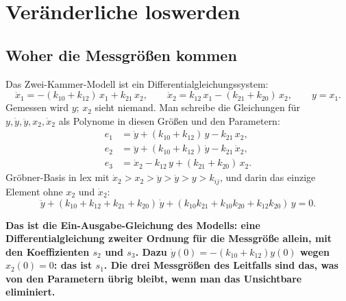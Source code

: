 \chapter{Veränderliche loswerden}

\section{Woher die Messgrößen kommen}

\begin{merksatz}
Das Zwei-Kammer-Modell ist ein Differentialgleichungssystem:
\[ \dot x_1 = -(k_{10} + k_{12})\,x_1 + k_{21}\,x_2, \qquad \dot x_2 = k_{12}\,x_1 - (k_{21} + k_{20})\,x_2, \qquad y = x_1 . \]
Gemessen wird $y$; $x_2$ sieht niemand. Man schreibe die Gleichungen für $y, \dot y, \ddot y, x_2, \dot x_2$ als Polynome in diesen Größen und den Parametern:
\begin{align*}
e_1 &= \dot y + (k_{10} + k_{12})\,y - k_{21}\,x_2, \\
e_2 &= \ddot y + (k_{10} + k_{12})\,\dot y - k_{21}\,\dot x_2, \\
e_3 &= \dot x_2 - k_{12}\,y + (k_{21} + k_{20})\,x_2 .
\end{align*}
Gröbner-Basis in lex mit $\dot x_2 > x_2 > \ddot y > \dot y > y > k_{ij}$, und darin das einzige Element ohne $x_2$ und $\dot x_2$:
\[ \ddot y + (k_{10} + k_{12} + k_{21} + k_{20})\,\dot y + (k_{10}k_{21} + k_{10}k_{20} + k_{12}k_{20})\,y = 0 . \]

\begin{center}
\begin{minipage}{0.9\textwidth}
\textbf{Das ist die Ein-Ausgabe-Gleichung des Modells: eine Differentialgleichung zweiter Ordnung für die Messgröße allein, mit den Koeffizienten $s_2$ und $s_3$. Dazu $\dot y(0) = -(k_{10} + k_{12})y(0)$ wegen $x_2(0) = 0$: das ist $s_1$. Die drei Messgrößen des Leitfalls sind das, was von den Parametern übrig bleibt, wenn man das Unsichtbare eliminiert.}
\end{minipage}
\end{center}

\begin{center}
\begin{minipage}{0.88\textwidth}
\end{minipage}
\end{center}
\end{merksatz}

